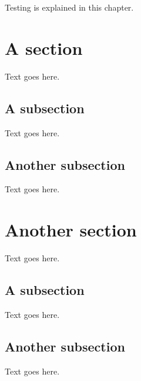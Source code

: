 Testing is explained in this chapter.


\section{A section}
Text goes here.

\subsection{A subsection}
Text goes here.

\subsection{Another subsection}
Text goes here.


\section{Another section}
Text goes here.

\subsection{A subsection}
Text goes here.

\subsection{Another subsection}
Text goes here.
